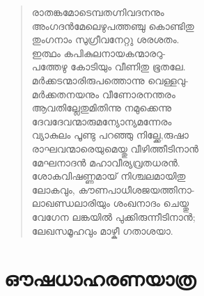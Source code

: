 \begin{verse}
രാതങ്കമോടെമ്പതഗ്നിവദനനും\\
അംഗദന്‍മേലെഴുപത്തഞ്ചു കൊണ്ടിതു\\
തുംഗനാം സുഗ്രീവനേറ്റു ശരശതം.\\
ഇത്ഥം കപികുലനായകന്മാരറു-\\
പത്തേഴു കോടിയും വീണിതു ഭൂതലേ.\\
മര്‍ക്കടന്മാരിരുപത്തൊന്നു വെള്ളവു-\\
മര്‍ക്കതനയനും വീണോരനന്തരം\\
ആവതില്ലേതുമിതിന്നു നമുക്കെന്നു\\
ദേവദേവന്മാരുമന്യോന്യമന്നേരം\\
വ്യാകുലം പൂണ്ടു പറഞ്ഞു നില്ക്കേ,രുഷാ\\
രാഘവന്മാരെയുമെയ്തു വീഴിത്തീടിനാന്‍\\
മേഘനാദന്‍ മഹാവീര്യവ്രതധരന്‍.\\
ശോകവിഷണ്ണമായ് നിശ്ചലമായിതു\\
ലോകവും, കൗണപാധീശജയത്തിനാ-\\
ലാഖണ്ഡലാരിയും ശംഖനാദം ചെയ്തു\\
വേഗേന ലങ്കയില്‍ പുക്കിരുന്നീടിനാന്‍;\\
ലേഖസമൂഹവും മാഴ്കീ ഗതാശയാ.
\end{verse}


\section{ഔഷധാഹരണയാത്ര}

